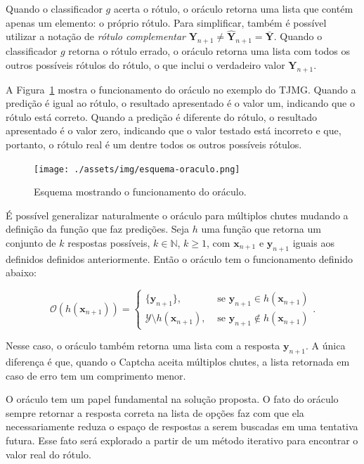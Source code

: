 \documentclass[12pt,twoside,brazilian]{book}
\begin{document}
Quando o classificador \(g\) acerta o rótulo, o oráculo retorna uma
lista que contém apenas um elemento: o próprio rótulo. Para simplificar,
também é possível utilizar a notação de \emph{rótulo complementar}
\(\mathbf Y_{n+1} \neq \hat {\mathbf Y}_{n+1} = \bar{\mathbf Y}\).
Quando o classificador \(g\) retorna o rótulo errado, o oráculo retorna
uma lista com todos os outros possíveis rótulos do rótulo, o que inclui
o verdadeiro valor \(\mathbf Y_{n+1}\).

A Figura~\ref{fig-esquema-oraculo} mostra o funcionamento do oráculo no
exemplo do TJMG. Quando a predição é igual ao rótulo, o resultado
apresentado é o valor um, indicando que o rótulo está correto. Quando a
predição é diferente do rótulo, o resultado apresentado é o valor zero,
indicando que o valor testado está incorreto e que, portanto, o rótulo
real é um dentre todos os outros possíveis rótulos.

\begin{figure}

{\centering \texttt{[image: ./assets/img/esquema-oraculo.png]}

}

\caption{\label{fig-esquema-oraculo}Esquema mostrando o funcionamento do
oráculo.}

\end{figure}

É possível generalizar naturalmente o oráculo para múltiplos chutes
mudando a definição da função que faz predições. Seja \(h\) uma função
que retorna um conjunto de \(k\) respostas possíveis,
\(k\in \mathbb N\), \(k\geq 1\), com \(\mathbf x_{n+1}\) e
\(\mathbf y_{n+1}\) iguais aos definidos definidos anteriormente. Então
o oráculo tem o funcionamento definido abaixo:

\[
\mathcal O(h(\mathbf x_{n+1})) = \left\{\begin{array}{ll}
    \{\mathbf y_{n+1}\}, & \text{ se } \mathbf y_{n+1} \in h(\mathbf x_{n+1})  \\
   \mathcal Y \setminus h(\mathbf x_{n+1}), & \text{ se } \mathbf y_{n+1} \notin h(\mathbf x_{n+1})
\end{array}\right..
\]

Nesse caso, o oráculo também retorna uma lista com a resposta
\(\mathbf y_{n+1}\). A única diferença é que, quando o Captcha aceita
múltiplos chutes, a lista retornada em caso de erro tem um comprimento
menor.

O oráculo tem um papel fundamental na solução proposta. O fato do
oráculo sempre retornar a resposta correta na lista de opções faz com
que ela necessariamente reduza o espaço de respostas a serem buscadas em
uma tentativa futura. Esse fato será explorado a partir de um método
iterativo para encontrar o valor real do rótulo.
\end{document}
